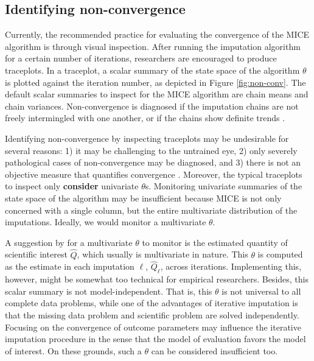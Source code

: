 \documentclass[Royal,times,sageh]{sagej}
\begin{document}
\hypertarget{identifying-non-convergence}{%
\subsection{Identifying non-convergence}\label{identifying-non-convergence}}

Currently, the recommended practice for evaluating the convergence of the MICE algorithm is through visual inspection. After running the imputation algorithm for a certain number of iterations, researchers are encouraged to produce traceplots. In a traceplot, a scalar summary of the state space of the algorithm \(\theta\) is plotted against the iteration number, as depicted in Figure \ref{fig:non-conv}. The default scalar summaries to inspect for the MICE algorithm are chain means and chain variances. Non-convergence is diagnosed if the imputation chains are not freely intermingled with one another, or if the chains show definite trends \citep{buur18}.

Identifying non-convergence by inspecting traceplots may be undesirable for several reasons: 1) it may be challenging to the untrained eye, 2) only severely pathological cases of non-convergence may be diagnosed, and 3) there is not an objective measure that quantifies convergence \citep[\(\S\) 6.5.2]{buur18}. Moreover, the typical traceplots to inspect only \textbf{consider} univariate \(\theta\)s. Monitoring univariate summaries of the state space of the algorithm may be insufficient because MICE is not only concerned with a single column, but the entire multivariate distribution of the imputations. Ideally, we would monitor a multivariate \(\theta\).

A suggestion by \citet{buur18} for a multivariate \(\theta\) to monitor is the estimated quantity of scientific interest \(\hat{Q}\), which usually is multivariate in nature. This \(\theta\) is computed as the estimate in each imputation \(\ell\), \(\hat{Q}_\ell\), across iterations. Implementing this, however, might be somewhat too technical for empirical researchers. Besides, this scalar summary is not model-independent. That is, this \(\theta\) is not universal to all complete data problems, while one of the advantages of iterative imputation is that the missing data problem and scientific problem are solved independently. Focusing on the convergence of outcome parameters may influence the iterative imputation procedure in the sense that the model of evaluation favors the model of interest. On these grounds, such a \(\theta\) can be considered insufficient too.
\end{document}
